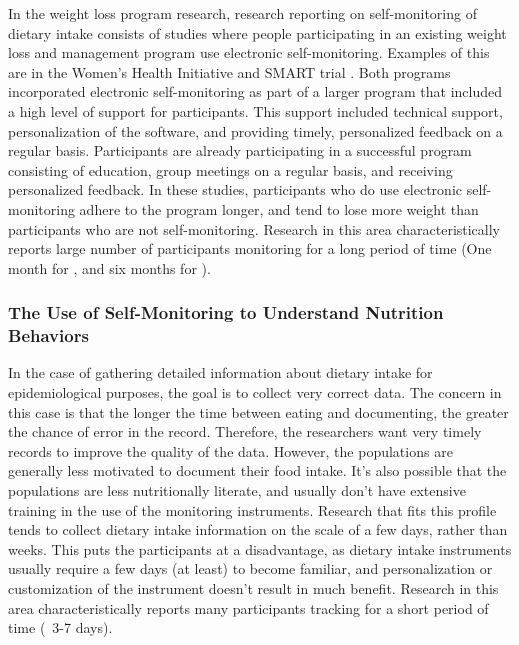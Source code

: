 In the weight loss program research, research reporting on self-monitoring of dietary intake consists of studies where people participating in an existing weight loss and management program use electronic self-monitoring.  Examples of this are in the Women's Health Initiative \citep{glanz_improving_2006} and SMART trial \citep{burke_self-monitoring_2011}. Both programs incorporated electronic self-monitoring as part of a larger program that included a high level of support for participants. This support included technical support,  personalization of the software, and providing timely, personalized feedback on a regular basis.  Participants are already participating in a successful program consisting of education, group meetings on a regular basis, and receiving personalized feedback. In these studies, participants who do use electronic self-monitoring adhere to the program longer, and tend to lose more weight than participants who are not self-monitoring. Research in this area characteristically reports large number of participants monitoring for a long period of time (One month for \cite{glanz_improving_2006}, and six months for \cite{burke_self-monitoring_2011}). 

\subsubsection{The Use of Self-Monitoring to Understand Nutrition Behaviors}

In the case of gathering detailed information about dietary intake for epidemiological purposes, the goal is to collect very correct data. The concern in this case is that the longer the time between eating and documenting, the greater the chance of error in the record. Therefore, the researchers want very timely records to improve the quality of the data. However, the populations are generally less motivated to document their food intake. It's also possible that the populations are less nutritionally literate, and usually don't have extensive training in the use of the monitoring instruments. Research that fits this profile tends to collect dietary intake information on the scale of a few days, rather than weeks. This puts the participants at a disadvantage, as dietary intake instruments usually require a few days (at least) to become familiar, and personalization or customization of the instrument doesn't result in much benefit. Research in this area characteristically reports many participants tracking for a short period of time (~3-7 days).


